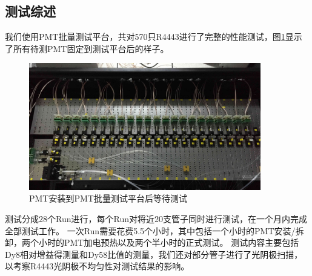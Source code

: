 \subsection{测试综述}
\label{sec:pmt_test:characterization_summary}
我们使用PMT批量测试平台，共对570只R4443进行了完整的性能测试，图\ref{fig:pmt_test:testbench_withpmt}显示了所有待测PMT固定到测试平台后的样子。
\begin{figure}[htbp]
	\centering
	\includegraphics[width=0.9\textwidth]{chap/pmt_test/fig/testbench_withpmts.jpg}
	\caption{PMT安装到PMT批量测试平台后等待测试}
	\label{fig:pmt_test:testbench_withpmt}
\end{figure}
测试分成28个Run进行，每个Run对将近20支管子同时进行测试，在一个月内完成全部测试工作。
一次Run需要花费5.5个小时，其中包括一个小时的PMT安装/拆卸，两个小时的PMT加电预热以及两个半小时的正式测试。
测试内容主要包括Dy8相对增益得测量和Dy58比值的测量，我们还对部分管子进行了光阴极扫描，以考察R4443光阴极不均匀性对测试结果的影响。

